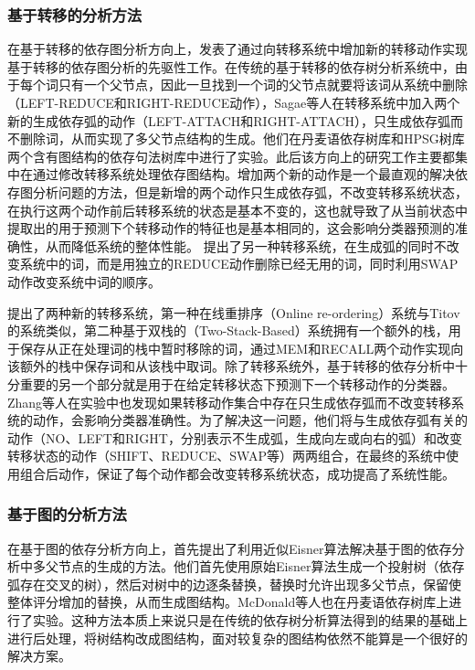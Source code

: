 \subsubsection{基于转移的分析方法}

在基于转移的依存图分析方向上，发表了通过向转移系统中增加新的转移动作实现基于转移的依存图分析的先驱性工作。在传统的基于转移的依存树分析系统中，由于每个词只有一个父节点，因此一旦找到一个词的父节点就要将该词从系统中删除（LEFT-REDUCE和RIGHT-REDUCE动作），Sagae等人在转移系统中加入两个新的生成依存弧的动作（LEFT-ATTACH和RIGHT-ATTACH），只生成依存弧而不删除词，从而实现了多父节点结构的生成。他们在丹麦语依存树库和HPSG树库两个含有图结构的依存句法树库中进行了实验。此后该方向上的研究工作主要都集中在通过修改转移系统处理依存图结构。增加两个新的动作是一个最直观的解决依存图分析问题的方法，但是新增的两个动作只生成依存弧，不改变转移系统状态，在执行这两个动作前后转移系统的状态是基本不变的，这也就导致了从当前状态中提取出的用于预测下个转移动作的特征也是基本相同的，这会影响分类器预测的准确性，从而降低系统的整体性能。
提出了另一种转移系统，在生成弧的同时不改变系统中的词，而是用独立的REDUCE动作删除已经无用的词，同时利用SWAP动作改变系统中词的顺序。

 提出了两种新的转移系统，第一种在线重排序（Online re-ordering）系统与Titov的系统类似，第二种基于双栈的（Two-Stack-Based）系统拥有一个额外的栈，用于保存从正在处理词的栈中暂时移除的词，通过MEM和RECALL两个动作实现向该额外的栈中保存词和从该栈中取词。除了转移系统外，基于转移的依存分析中十分重要的另一个部分就是用于在给定转移状态下预测下一个转移动作的分类器。Zhang等人在实验中也发现如果转移动作集合中存在只生成依存弧而不改变转移系统的动作，会影响分类器准确性。为了解决这一问题，他们将与生成依存弧有关的动作（NO、LEFT和RIGHT，分别表示不生成弧，生成向左或向右的弧）和改变转移状态的动作（SHIFT、REDUCE、SWAP等）两两组合，在最终的系统中使用组合后动作，保证了每个动作都会改变转移系统状态，成功提高了系统性能。

\subsubsection{基于图的分析方法}

在基于图的依存分析方向上，首先提出了利用近似Eisner算法\cite{eisner1996three}解决基于图的依存分析中多父节点的生成的方法。他们首先使用原始Eisner算法生成一个投射树（依存弧存在交叉的树），然后对树中的边逐条替换，替换时允许出现多父节点，保留使整体评分增加的替换，从而生成图结构。McDonald等人也在丹麦语依存树库上进行了实验。这种方法本质上来说只是在传统的依存树分析算法得到的结果的基础上进行后处理，将树结构改成图结构，面对较复杂的图结构依然不能算是一个很好的解决方案。

